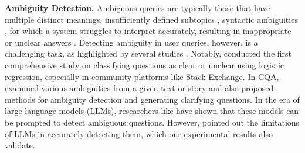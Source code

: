 \textbf{Ambiguity Detection.} 
\label{sec:related_work}
Ambiguous queries are typically those that have multiple distinct meanings, insufficiently defined subtopics \cite{clarke2009overview}, syntactic ambiguities \cite{schlangen2004causes}, for which a system struggles to interpret accurately, resulting in inappropriate or unclear answers \cite{keyvan2022approach}. Detecting ambiguity in user queries, however, is a challenging task, as highlighted by several studies \cite{braslavski2017you, trienes2019identifying, guo2021abgcoqa}. Notably, \cite{trienes2019identifying} conducted the first comprehensive study on classifying questions as clear or unclear using logistic regression, especially in community platforms like Stack Exchange.
In CQA, \citet{guo2021abgcoqa} examined various ambiguities from a given text or story and also proposed methods for ambiguity detection and generating clarifying questions. 
In the era of large language models (LLMs), researchers like \cite{kuhn2022clam, zhang2024clamber} have shown that these models can be prompted to detect ambiguous questions. However, \citet{zhang2024clamber} pointed out the limitations of LLMs in accurately detecting them, which our experimental results also validate. 
